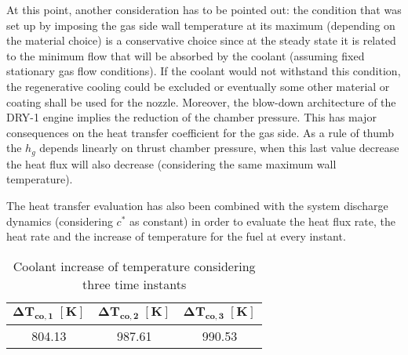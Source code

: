 At this point, another consideration has to be pointed out: the condition that was set up by imposing the gas side wall temperature at its maximum (depending on the material choice) is a conservative choice since at the steady state it is related to the minimum flow that will be absorbed by the coolant (assuming fixed stationary gas flow conditions). If the coolant would not withstand this condition, the regenerative cooling could be excluded or eventually some other material or coating shall be used for the nozzle. Moreover, the blow-down architecture of the DRY-1 engine implies the reduction of the chamber pressure. This has major consequences on the heat transfer coefficient for the gas side. As a rule of thumb the $h_g$ depends linearly on thrust chamber pressure, when this last value decrease the heat flux will also decrease (considering the same maximum wall temperature). 

The heat transfer evaluation has also been combined with the system discharge dynamics (considering $c^*$ as constant) in order to evaluate the heat flux rate, the heat rate and the increase of temperature for the fuel at every instant. 

\begin{table}[H]
    \renewcommand{\arraystretch}{1.5}
    \centering
    \begin{tabular}{|c|c|c|}
        \hline
        $\boldsymbol{\Delta T_{co,1} \; [\textbf{K}]}$ & $\boldsymbol{\Delta T_{co,2} \; [\textbf{K}]}$ & $\boldsymbol{\Delta T_{co,3} \; [\textbf{K}]}$ \\
        \hline
        \hline
        804.13 & 987.61 & 990.53 \\
        \hline
    \end{tabular}
    \caption{Coolant increase of temperature considering three time instants}
    \label{table:dt_cooling}
\end{table}


